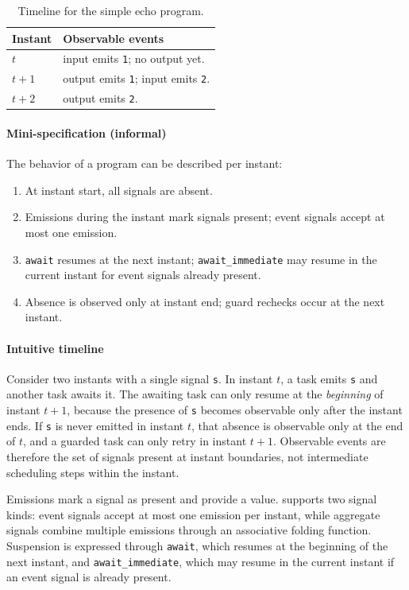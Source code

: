 \begin{table}[h]
\centering
\begin{tabularx}{\linewidth}{lY}
\hline
Instant & Observable events \\ \hline
$t$ & input emits \texttt{1}; no output yet. \\
$t{+}1$ & output emits \texttt{1}; input emits \texttt{2}. \\
$t{+}2$ & output emits \texttt{2}. \\ \hline
\end{tabularx}
\caption{Timeline for the simple echo program.}
\end{table}

\paragraph{Mini-specification (informal)}
The behavior of a program can be described per instant:
\begin{enumerate}
\item At instant start, all signals are absent.
\item Emissions during the instant mark signals present; event signals accept
  at most one emission.
\item \texttt{await} resumes at the next instant; \texttt{await\_immediate}
  may resume in the current instant for event signals already present.
\item Absence is observed only at instant end; guard rechecks occur at the next
  instant.
\end{enumerate}

\paragraph{Intuitive timeline}
Consider two instants with a single signal \texttt{s}. In instant $t$, a task
emits \texttt{s} and another task awaits it. The awaiting task can only resume
at the \emph{beginning} of instant $t{+}1$, because the presence of \texttt{s}
becomes observable only after the instant ends. If \texttt{s} is never emitted
in instant $t$, that absence is observable only at the end of $t$, and a
guarded task can only retry in instant $t{+}1$. Observable events are therefore
the set of signals present at instant boundaries, not intermediate scheduling
steps within the instant.

Emissions mark a signal as present and provide a value. \tempo{} supports two
signal kinds: event signals accept at most one emission per instant, while
aggregate signals combine multiple emissions through an associative folding
function. Suspension is expressed through \texttt{await}, which resumes at the
beginning of the next instant, and \texttt{await\_immediate}, which may resume
in the current instant if an event signal is already present.

